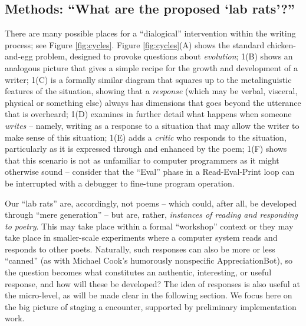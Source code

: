 \subsection{Methods: ``What are the proposed `lab rats'?''}
\label{sec:methods}



There are many possible places for a ``dialogical'' intervention
within the writing process; see Figure \ref{fig:cycles}.  Figure
\ref{fig:cycles}(A) shows the standard chicken-and-egg problem,
designed to provoke questions about \emph{evolution}; 1(B) shows an
analogous picture that gives a simple recipe for the growth and
development of a writer; 1(C) is a formally similar diagram that
squares up to the metalinguistic features of the situation, showing
that a \emph{response} (which may be verbal, visceral, physical or
something else) always has dimensions that goes beyond the utterance
that is overheard; 1(D) examines in further detail what happens when
someone \emph{writes} -- namely, writing as a response to a situation
that may allow the writer to make sense of this situation; 1(E) adds a
\emph{critic} who responds to the situation, particularly as it is
expressed through and enhanced by the poem; 1(F) shows that this
scenario is not as unfamiliar to computer programmers as it might
otherwise sound -- consider that the ``Eval'' phase in a
Read-Eval-Print loop can be interrupted with a debugger to fine-tune
program operation.

Our ``lab rats'' are, accordingly, not poems -- which could, after
all, be developed through ``mere generation'' -- but are, rather,
\emph{instances of reading and responding to poetry}.  This may take
place within a formal ``workshop'' context or they may take place in
smaller-scale experiments where a computer system reads and responds
to other poets.  Naturally, such responses can also be more or less
``canned'' (as with Michael Cook's humorously nonspecific
AppreciationBot), so the question becomes what constitutes an
authentic, interesting, or useful response, and how will these be
developed?  The idea of responses is also useful at the micro-level,
as will be made clear in the following section.  We focus here on the
big picture of staging a encounter, supported by preliminary
implementation work.

